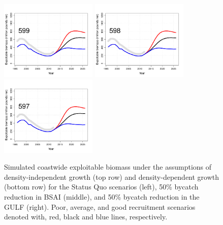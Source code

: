 \begin{figure}[htbp]
		\includegraphics[height=1.5in]{../FIGURES/fig_SQUO_DD_EBio.pdf}
		\includegraphics[height=1.5in]{../FIGURES/fig_BSAI_DD_EBio.pdf}
		\includegraphics[height=1.5in]{../FIGURES/fig_GULF_DD_EBio.pdf}		
	\caption{Simulated coastwide exploitable  biomass under the assumptions of density-independent growth (top row) and density-dependent growth (bottom row) for the Status Quo scenarios (left), 50\% bycatch reduction in BSAI (middle), and 50\% bycatch reduction in the GULF (right).  Poor, average, and good recruitment scenarios denoted with, red, black and blue lines, respectively.}
	\label{fig:FIGURES_fig_SQUO_DI_EBio}
\end{figure}


